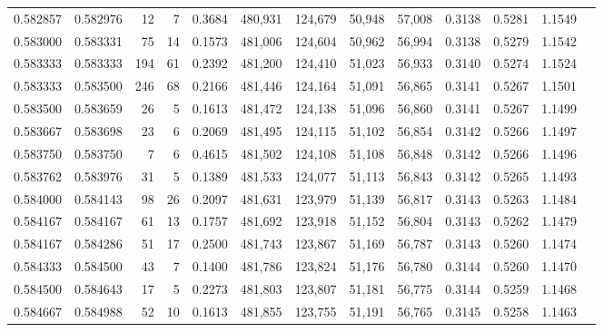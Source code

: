 \begin{tabular}{rrrrrrrrrrrrr}
0.582857 & 0.582976 &    12 &   7 &                                     0.3684 & 480,931 & 124,679 &  50,948 &  57,008 & 0.3138 & 0.5281 & 1.1549 \\
0.583000 & 0.583331 &    75 &  14 &                                     0.1573 & 481,006 & 124,604 &  50,962 &  56,994 & 0.3138 & 0.5279 & 1.1542 \\
0.583333 & 0.583333 &   194 &  61 &                                     0.2392 & 481,200 & 124,410 &  51,023 &  56,933 & 0.3140 & 0.5274 & 1.1524 \\
0.583333 & 0.583500 &   246 &  68 &                                     0.2166 & 481,446 & 124,164 &  51,091 &  56,865 & 0.3141 & 0.5267 & 1.1501 \\
0.583500 & 0.583659 &    26 &   5 &                                     0.1613 & 481,472 & 124,138 &  51,096 &  56,860 & 0.3141 & 0.5267 & 1.1499 \\
0.583667 & 0.583698 &    23 &   6 &                                     0.2069 & 481,495 & 124,115 &  51,102 &  56,854 & 0.3142 & 0.5266 & 1.1497 \\
0.583750 & 0.583750 &     7 &   6 &                                     0.4615 & 481,502 & 124,108 &  51,108 &  56,848 & 0.3142 & 0.5266 & 1.1496 \\
0.583762 & 0.583976 &    31 &   5 &                                     0.1389 & 481,533 & 124,077 &  51,113 &  56,843 & 0.3142 & 0.5265 & 1.1493 \\
0.584000 & 0.584143 &    98 &  26 &                                     0.2097 & 481,631 & 123,979 &  51,139 &  56,817 & 0.3143 & 0.5263 & 1.1484 \\
0.584167 & 0.584167 &    61 &  13 &                                     0.1757 & 481,692 & 123,918 &  51,152 &  56,804 & 0.3143 & 0.5262 & 1.1479 \\
0.584167 & 0.584286 &    51 &  17 &                                     0.2500 & 481,743 & 123,867 &  51,169 &  56,787 & 0.3143 & 0.5260 & 1.1474 \\
0.584333 & 0.584500 &    43 &   7 &                                     0.1400 & 481,786 & 123,824 &  51,176 &  56,780 & 0.3144 & 0.5260 & 1.1470 \\
0.584500 & 0.584643 &    17 &   5 &                                     0.2273 & 481,803 & 123,807 &  51,181 &  56,775 & 0.3144 & 0.5259 & 1.1468 \\
0.584667 & 0.584988 &    52 &  10 &                                     0.1613 & 481,855 & 123,755 &  51,191 &  56,765 & 0.3145 & 0.5258 & 1.1463 \\

\end{tabular}
